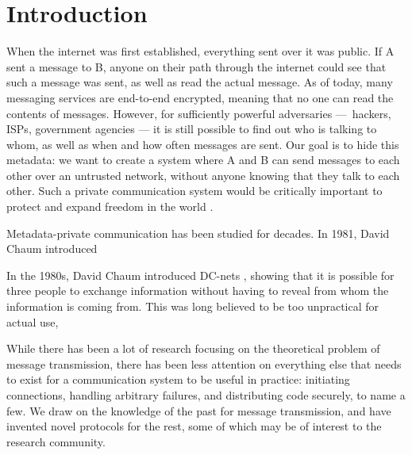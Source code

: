 \section{Introduction}

When the internet was first established, everything sent over it was public. If A sent a message to B, anyone on their path through the internet could see that such a message was sent, as well as read the actual message. As of today, many messaging services are end-to-end encrypted, meaning that no one can read the contents of messages. However, for sufficiently powerful adversaries — hackers, ISPs, government agencies — it is still possible to find out who is talking to whom, as well as when and how often messages are sent. Our goal is to hide this metadata: we want to create a system where A and B can send messages to each other over an untrusted network, without anyone knowing that they talk to each other. Such a private communication system would be critically important to protect and expand freedom in the world \cite{arvid}.

Metadata-private communication has been studied for decades. In 1981, David Chaum introduced

In the 1980s, David Chaum introduced DC-nets \cite{chaum1988dining}, showing that it is possible for three people to exchange information without having to reveal from whom the information is coming from. This was long believed to be too unpractical for actual use,

While there has been a lot of research focusing on the theoretical problem of message transmission, there has been less attention on everything else that needs to exist for a communication system to be useful in practice: initiating connections, handling arbitrary failures, and distributing code securely, to name a few. We draw on the knowledge of the past for message transmission, and have invented novel protocols for the rest, some of which may be of interest to the research community.